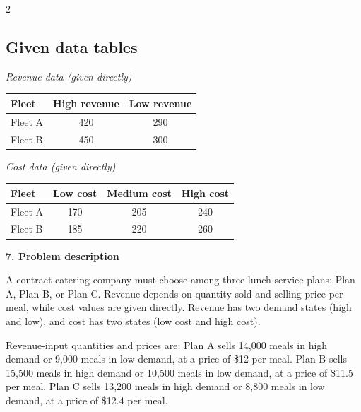 \documentclass[12pt]{article}
\newcommand{\SubsectionBox}[1]{%
	\noindent\colorbox{gray!30}{%
		\parbox{\linewidth}{\textbf{#1}}%
	}\par\vspace{0.35cm}%
}
\begin{document}
\begin{multicols}{2}
				\subsection*{Given data tables}
				\begin{center}
					\begin{minipage}[t]{0.48\linewidth}
						\textit{Revenue data (given directly)}
						\begin{center}
							\begin{tabular}{l c c}
								\toprule
								Fleet & High revenue & Low revenue \\
								\midrule
								Fleet A & 420 & 290 \\
								Fleet B & 450 & 300 \\
								\bottomrule
							\end{tabular}
						\end{center}
					\end{minipage}
					\hfill
					\begin{minipage}[t]{0.48\linewidth}
						\textit{Cost data (given directly)}
						\begin{center}
							\begin{tabular}{l c c c}
								\toprule
								Fleet & Low cost & Medium cost & High cost \\
								\midrule
								Fleet A & 170 & 205 & 240 \\
								Fleet B & 185 & 220 & 260 \\
								\bottomrule
							\end{tabular}
						\end{center}
					\end{minipage}
				\end{center}

		\vspace{0.25cm}
		\SubsectionBox{7. Problem description}\vspace{-0.25cm}
		A contract catering company must choose among three lunch-service plans: Plan A, Plan B, or Plan C.
				Revenue depends on quantity sold and selling price per meal, while cost values are given directly.
				Revenue has two demand states (high and low), and cost has two states (low cost and high cost).
				
				Revenue-input quantities and prices are:
				Plan A sells 14{,}000 meals in high demand or 9{,}000 meals in low demand, at a price of \$12 per meal.
				Plan B sells 15{,}500 meals in high demand or 10{,}500 meals in low demand, at a price of \$11.5 per meal.
				Plan C sells 13{,}200 meals in high demand or 8{,}800 meals in low demand, at a price of \$12.4 per meal.
				

\end{multicols}
\end{document}
